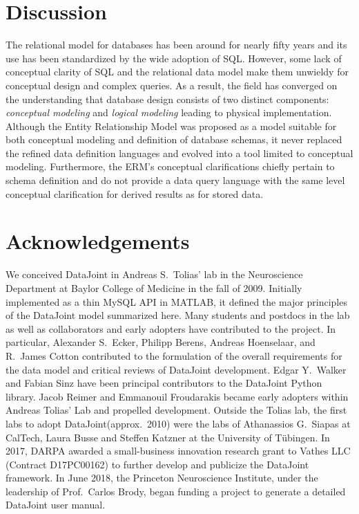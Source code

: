 \documentclass[letter,10pt]{article}
\newcommand{\datajoint}{DataJoint\xspace}
\begin{document}
\section{Discussion}
The relational model for databases has been around for nearly fifty years and its use has been standardized by the wide adoption of SQL.
However, some lack of conceptual clarity of SQL and the relational data model make them unwieldy for conceptual design and complex queries.
As a result, the field has converged on the understanding that database design consists of two distinct components: \emph{conceptual modeling} and \emph{logical modeling} leading to physical implementation. 
Although the Entity Relationship Model was proposed as a model suitable for both conceptual modeling and definition of database schemas, it never replaced the refined data definition languages and evolved into a tool limited to conceptual modeling.  
Furthermore, the ERM's conceptual clarifications chiefly pertain to schema definition and do not provide a data query language with the same level conceptual clarification for derived results as for stored data.

\section{Acknowledgements}
We conceived \datajoint in Andreas S.\ Tolias' lab in the Neuroscience Department at Baylor College of Medicine in the fall of 2009. 
Initially implemented as a thin MySQL API in MATLAB, it defined the major principles of the \datajoint model summarized here. 
Many students and postdocs in the lab as well as collaborators and early adopters have contributed to the project.
In particular, Alexander S.\ Ecker, Philipp Berens, Andreas Hoenselaar, and R.\ James Cotton contributed to the formulation of the overall requirements for the data model and critical reviews of \datajoint development.
Edgar Y.\ Walker and Fabian Sinz have been principal contributors to the \datajoint Python library. 
Jacob Reimer and Emmanouil Froudarakis became early adopters within Andreas Tolias' Lab and propelled development.
Outside the Tolias lab, the first labs to adopt \datajoint (approx.\ 2010) were the labs of Athanassios G.\ Siapas at CalTech, Laura Busse and Steffen Katzner at the University of T\"ubingen.
In 2017, DARPA awarded a small-business innovation research grant to Vathes LLC (Contract D17PC00162) to further develop and publicize the \datajoint framework. 
In June 2018, the Princeton Neuroscience Institute, under the leadership of Prof.\ Carlos Brody, began funding a project to generate a detailed DataJoint user manual.  
\end{document}
